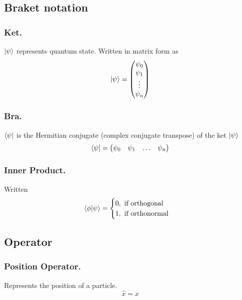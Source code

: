 \documentclass[../../../main.tex]{subfiles}
\begin{document}
\subsection{Braket notation}
\subsubsection{Ket.} $\ket{\psi}$ represents quantum state. Written in matrix form as 
\begin{equation*}
    \ket{\psi}=\begin{pmatrix}
        \psi_0\\
        \psi_1\\
        \vdots\\
        \psi_n
    \end{pmatrix}
\end{equation*}
\subsubsection{Bra.} $\bra{\psi}$ is the Hermitian conjugate (complex conjugate transpose) of the ket $\ket{\psi}$
\begin{equation*}
    \bra{\psi}=\begin{pmatrix}
        \psi_0&
        \psi_1&
        \ldots&
        \psi_n
    \end{pmatrix}
\end{equation*}

\subsubsection{Inner Product.} Written
\begin{equation*}
    \braket{\phi|\psi}=\begin{cases}
        0, \text{ if orthogonal}\\
        1, \text{ if orthonormal}
    \end{cases}
\end{equation*}

\subsection{Operator}
\subsubsection{Position Operator.} Represents the position of a particle.
\begin{equation*}
    \hat{x}=x
\end{equation*}
\end{document}
